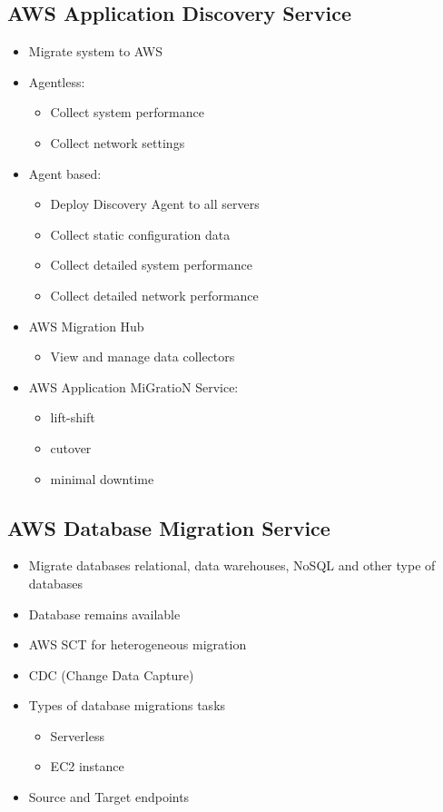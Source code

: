\documentclass[../../main.tex]{subfiles}
\begin{document}
\subsection{AWS Application Discovery Service}
\begin{itemize}
    \item Migrate system to AWS
    \item Agentless:
    \begin{itemize}
        \item Collect system performance
        \item Collect network settings
    \end{itemize}
    \item Agent based:
    \begin{itemize}
        \item Deploy Discovery Agent to all servers
        \item Collect static configuration data
        \item Collect detailed system performance
        \item Collect detailed network performance
    \end{itemize}
    \item AWS Migration Hub
    \begin{itemize}
        \item View and manage data collectors
    \end{itemize}
    \item AWS Application MiGratioN Service:
    \begin{itemize}
        \item lift-shift
        \item cutover
        \item minimal downtime
    \end{itemize}
\end{itemize}

\subsection{AWS Database Migration Service}
\begin{itemize}
    \item Migrate databases relational, data warehouses, NoSQL and other type of databases
    \item Database remains available
    \item AWS SCT for heterogeneous migration
    \item CDC (Change Data Capture)
    \item Types of database migrations tasks
    \begin{itemize}
        \item Serverless
        \item EC2 instance
    \end{itemize}
    \item Source and Target endpoints
\end{itemize}
\end{document}
